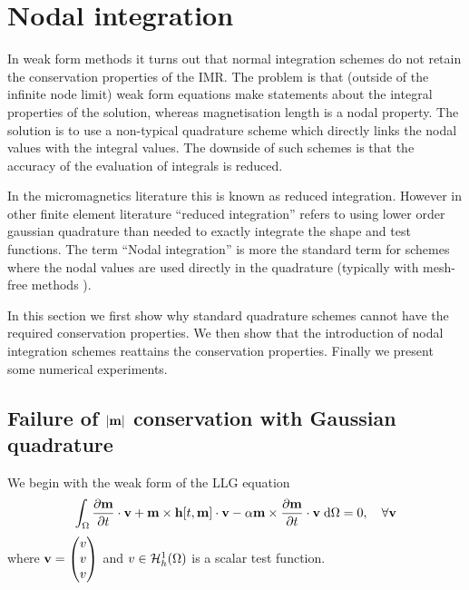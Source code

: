 \section{Nodal integration}


In weak form methods it turns out that normal integration schemes do not retain the conservation properties of the IMR.
The problem is that (outside of the infinite node limit) weak form equations make statements about the integral properties of the solution, whereas magnetisation length is a nodal property.
The solution is to use a non-typical quadrature scheme which directly links the nodal values with the integral values.
The downside of such schemes is that the accuracy of the evaluation of integrals is reduced.

In the micromagnetics literature this is known as reduced integration\cite{Cimrak2008}.
However in other finite element literature ``reduced integration'' refers to using lower order gaussian quadrature than needed to exactly integrate the shape and test functions.
The term ``Nodal integration'' is more the standard term for schemes where the nodal values are used directly in the quadrature (typically with mesh-free methods \eg \cite{Puso2008}).

In this section we first show why standard quadrature schemes cannot have the required conservation properties.
We then show that the introduction of nodal integration schemes reattains the conservation properties.
Finally we present some numerical experiments.



\subsection{Failure of $\left|{\mathbf{m}} \right|$ conservation with Gaussian quadrature}

\newcommand{\ipg}[2]{\intd{{#1} \cdot {#2}}}

We begin with the weak form of the LLG equation
\begin{equation}
  \label{eq:weak-llg}
  {\int_{\Omega} \frac{\partial \mathbf{m}}{\partial t}\cdot \mathbf{v}+ \mathbf{m}\times \mathbf{h}[t, \mathbf{m}] \cdot \mathbf{v}- \alpha\mathbf{m}\times \frac{\partial \mathbf{m}}{\partial t}\cdot \mathbf{v}{\; \text{d}}{\Omega}} = 0, \quad \forall \mathbf{v}
\end{equation}
where $\mathbf{v} = \begin{pmatrix} v \\ v \\ v \end{pmatrix}$ and $v \in {\mathcal{H}^1_h(\Omega)}$ is a scalar test function.

\newcommand{\midpoint}[1]{\hat{#1}}
\newsubcommand{\mvm}{\midpoint{\mv}}{n}
\newcommand{\tm}{\midpoint{t}_n}

\newcommand{\dtop}{\delta}
\newcommand{\dmdtm}{\dtop \mv_n}

